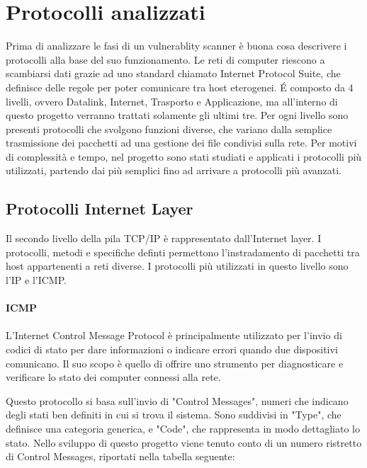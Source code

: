 \documentclass[12pt]{report}
\begin{document}
\chapter{Protocolli analizzati}
\label{cap:protocolli-analizzati}

Prima di analizzare le fasi di un vulnerablity scanner è buona cosa descrivere i protocolli alla base del suo funzionamento. Le reti di computer riescono a scambiarsi dati grazie ad uno standard chiamato Internet Protocol Suite, che definisce delle regole per poter comunicare tra host eterogenei. \'{E} composto da 4 livelli, ovvero Datalink, Internet, Trasporto e Applicazione, ma all'interno di questo progetto verranno trattati solamente gli ultimi tre. Per ogni livello sono presenti protocolli che svolgono funzioni diverse, che variano dalla semplice trasmissione dei pacchetti ad una gestione dei file condivisi sulla rete. Per motivi di complessità e tempo, nel progetto sono stati studiati e applicati i protocolli più utilizzati, partendo dai più semplici fino ad arrivare a protocolli più avanzati.\cite{computer2021tanenbaum}

\section{Protocolli Internet Layer}

Il secondo livello della pila TCP/IP è rappresentato dall'Internet layer. I protocolli, metodi e specifiche definti permettono l'instradamento di pacchetti tra host appartenenti a reti diverse. I  protocolli più utilizzati in questo livello sono l'IP e l'ICMP.
\\\\
\textbf{ICMP}
\\\\
L'Internet Control Message Protocol è principalmente utilizzato per l'invio di codici di stato per dare informazioni o indicare errori quando due dispositivi comunicano. Il suo scopo è quello di offrire uno strumento per diagnosticare e verificare lo stato dei computer connessi alla rete.\cite{rfcICMP}

Questo protocollo si basa sull'invio di "Control Messages", numeri che indicano degli stati ben definiti in cui si trova il sistema. Sono suddivisi in "Type", che definisce una categoria generica, e "Code", che rappresenta in modo dettagliato lo stato. Nello sviluppo di questo progetto viene tenuto conto di un numero ristretto di Control Messages, riportati nella tabella seguente:
\end{document}
